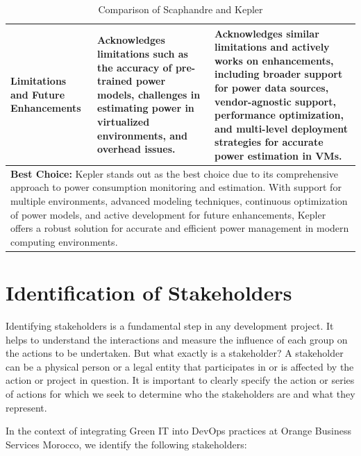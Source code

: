 \begin{table}[htbp]
\begin{tabular}{|p{3cm}|p{6cm}|p{6cm}|}
  \hline
  Limitations and Future Enhancements & Acknowledges limitations such as the accuracy of pre-trained power models, challenges in estimating power in virtualized environments, and overhead issues. & Acknowledges similar limitations and actively works on enhancements, including broader support for power data sources, vendor-agnostic support, performance optimization, and multi-level deployment strategies for accurate power estimation in VMs. \\
  \hline
  \multicolumn{3}{|p{15cm}|}{\textbf{Best Choice:} Kepler stands out as the best choice due to its comprehensive approach to power consumption monitoring and estimation. With support for multiple environments, advanced modeling techniques, continuous optimization of power models, and active development for future enhancements, Kepler offers a robust solution for accurate and efficient power management in modern computing environments.} \\
  \hline
  \end{tabular}
  \caption{Comparison of Scaphandre and Kepler}
  \label{tab:comparison}
  \end{table}

\newpage


\section{Identification of Stakeholders}
\label{subsec:identification_stakeholders}

Identifying stakeholders is a fundamental step in any development project. It helps to understand the interactions and measure the influence of each group on the actions to be undertaken. But what exactly is a stakeholder? A stakeholder can be a physical person or a legal entity that participates in or is affected by the action or project in question. It is important to clearly specify the action or series of actions for which we seek to determine who the stakeholders are and what they represent.

In the context of integrating Green IT into DevOps practices at Orange Business Services Morocco, we identify the following stakeholders:


